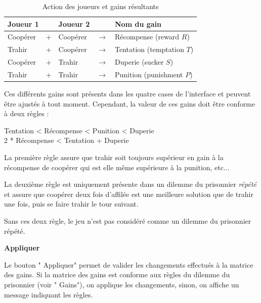 \documentclass[a4paper, french]{article}
\newcommand*\circled[1]{\tikz[baseline=(char.base)]{
                \node[shape=circle,thick,draw,inner sep=2pt] (char) {\textbf{#1}};}
            }
\newcommand*\tinycircled[1]{\tikz[baseline=(char.base)]{
                \node[shape=circle,draw,inner sep=1pt] (char) {\footnotesize{#1}};}
            }
\begin{document}
\begin{table}[htp]
    \centering
    \begin{tabular}{lllll}
        \hline
        \textbf{Joueur 1} &   & \textbf{Joueur 2} &               & \textbf{Nom du gain}       \\ \hline
        Coopérer          & + & Coopérer          & $\rightarrow$ & Récompense (reward $R$)    \\
        Trahir            & + & Coopérer          & $\rightarrow$ & Tentation (temptation $T$) \\
        Coopérer          & + & Trahir            & $\rightarrow$ & Duperie (sucker $S$)       \\
        Trahir            & + & Trahir            & $\rightarrow$ & Punition (punishment $P$)  \\ \hline
    \end{tabular}
    \caption{Action des joueurs et gains résultants}
\end{table}

Ces différents gains sont présents dans les quatre cases de l'interface et peuvent être ajustés à tout moment. Cependant, la valeur de ces gains doit être conforme à deux règles :

\begin{framed}
    \centering
    Tentation < Récompense < Punition < Duperie\\
    2 * Récompense < Tentation + Duperie
\end{framed}

La première règle assure que trahir soit toujours supérieur en gain à la récompense de coopérer qui est elle même supérieure à la punition, etc... 

La deuxième règle est uniquement présente dans un dilemme du prisonnier \textit{répété} et assure que coopérer deux fois d'affilée est une meilleure solution que de trahir une fois, puis se faire trahir le tour suivant.

Sans ces deux règle, le jeu n'est pas considéré comme un dilemme du prisonnier répété.

\textbf{\circled{2} Appliquer}

Le bouton "\tinycircled{2} Appliquer" permet de valider les changements effectués à la matrice des gains. Si la matrice des gains est conforme aux règles du dilemme du prisonnier (voir "\tinycircled{1} Gains"), on applique les changements, sinon, on affiche un message indiquant les règles.


\pagebreak
\end{document}
